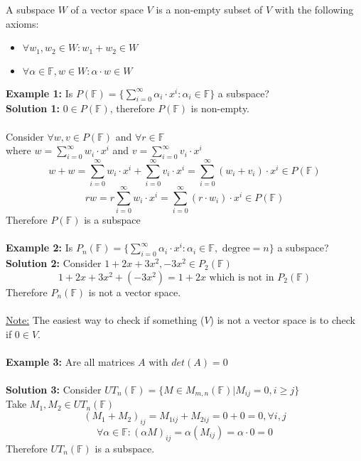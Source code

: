\documentclass[12pt]{article}
\begin{document}
\begin{tcolorbox}[title=Definition: Subspace]
	A subspace $W$ of a vector space $V$ is a non-empty subset of $V$ with the following axioms:
	\begin{itemize}
		\item{$\forall w_1, w_2 \in W : w_1 + w_2 \in W$}
		\item{$\forall \alpha \in \mathbb{F}, w \in W : \alpha \cdot w \in W$}
	\end{itemize}
\end{tcolorbox}

\textbf{Example 1:} Is $P(\mathbb{F}) = \{ \sum_{i=0}^{\infty} \alpha_i \cdot x^i : \alpha_i \in \mathbb{F} \}$ a subspace?\\

\textbf{Solution 1:} $0 \in P(\mathbb{F})$, therefore $P(\mathbb{F})$ is non-empty.\\
\\
Consider $\forall w, v \in P(\mathbb{F})$ and $\forall r \in\mathbb{F}$\\
where $w = \sum_{i=0}^{\infty} w_i \cdot x^i$ and $v = \sum_{i=0}^{\infty} v_i \cdot x^i$
$$w+w = \sum_{i=0}^{\infty} w_i \cdot x^i + \sum_{i=0}^{\infty} v_i \cdot x^i = \sum_{i=0}^{\infty} (w_i + v_i) \cdot x^i \in P(\mathbb{F})$$
$$rw = r\sum_{i=0}^{\infty} w_i \cdot x^i = \sum_{i=0}^{\infty} (r\cdot w_i) \cdot x^i \in P(\mathbb{F})$$
Therefore $P(\mathbb{F})$ is a subspace\\
\\
\textbf{Example 2:} Is $P_n (\mathbb{F}) = \{ \sum_{i=0}^{\infty} \alpha_i \cdot x^i : \alpha_i \in \mathbb{F}, \text{ degree} = n \}$ a subspace?\\

\textbf{Solution 2:} Consider $1 + 2x + 3x^2, -3x^2 \in P_2 (\mathbb{F})$
$$1 + 2x + 3x^2 + (-3x^2) = 1 + 2x \text{ which is not in } P_2 (\mathbb{F})$$
Therefore $P_n (\mathbb{F})$ is not a vector space.\\
\\
\underline{Note:} The easiest way to check if something ($V$) is not a vector space is to check if $0 \in V$.\\
\\
\textbf{Example 3:} Are all matrices $A$ with $det(A) = 0$\\
\\
\textbf{Solution 3:} Consider $UT_n (\mathbb{F}) = \{ M \in M_{m,n} (\mathbb{F}) | M_{ij} = 0, i \geq j \}$\\
Take $M_1, M_2 \in UT_n (\mathbb{F})$\\
$$(M_1 + M_2)_{ij} = M_{1ij} + M_{2ij} = 0 + 0 = 0, \forall i,j$$
$$\forall \alpha \in \mathbb{F} : (\alpha M)_{ij} = \alpha (M_{ij}) = \alpha \cdot 0 = 0$$
Therefore $UT_n (\mathbb{F})$ is a subspace.
\end{document}
